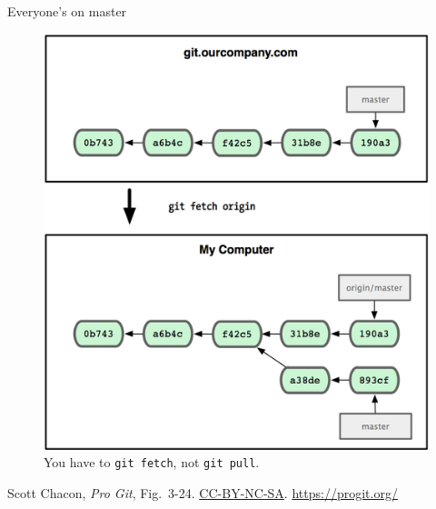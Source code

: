 \begin{frame}{Everyone's on master}
  \begin{figure}
    \includegraphics[scale=0.8]{18333fig0324-tn.png}
    \\ You have to \texttt{git fetch}, not \texttt{git pull}.
  \end{figure}
  \footnotesize{Scott Chacon,
    \emph{Pro Git},
    Fig.~3-24.
    \href{https://creativecommons.org/licenses/by-nc-sa/3.0/legalcode}{CC-BY-NC-SA}.
    \href{https://progit.org/}{https://progit.org/}}
\end{frame}


